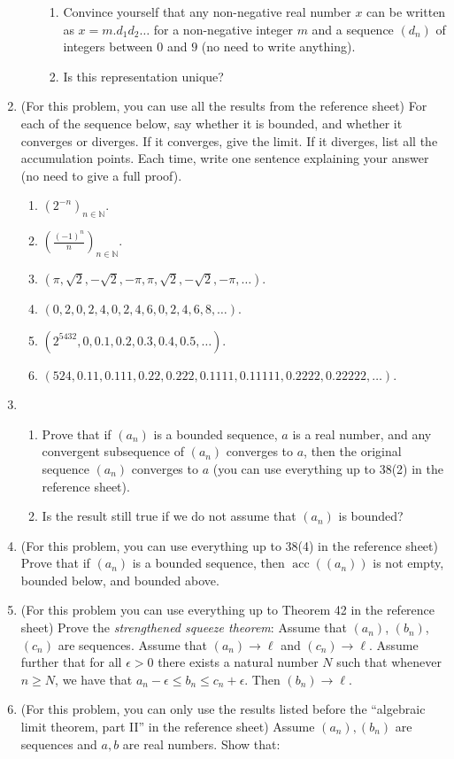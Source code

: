 \documentclass{amsart}
\theoremstyle{definition}
\newcommand{\acc}{\operatorname{acc}}
\begin{document}
\begin{enumerate}
\begin{enumerate}
    \begin{enumerate}
    \item Convince yourself that any non-negative real number $x$ can be written as $x = m. d_1 d_2 \ldots$ for a non-negative integer $m$ and a sequence $(d_n)$ of integers between $0$ and $9$ (no need to write anything).
    \item Is this representation unique?
    \end{enumerate}
  \end{enumerate}
\item (For this problem, you can use all the results from the reference sheet) For each of the sequence below, say whether it is bounded, and whether it converges or diverges. If it converges, give the limit. If it diverges, list all the accumulation points. Each time, write one sentence explaining your answer (no need to give a full proof). 

  \begin{enumerate}

  \item $(2^{-n})_{n \in \mathbb{N}}$.
  \item $(\frac{(-1)^n}{n})_{n \in \mathbb{N}}$.
  \item $(\pi, \sqrt{2}, -\sqrt{2}, -\pi, \pi, \sqrt{2}, -\sqrt{2}, -\pi, \ldots)$.    
  \item $(0, 2, 0, 2, 4, 0, 2, 4, 6, 0, 2, 4, 6, 8, \ldots)$.    
  \item $(2^{5432}, 0, 0.1, 0.2, 0.3, 0.4, 0.5, \ldots)$.
  \item $(524, 0.11, 0.111, 0.22, 0.222, 0.1111, 0.11111, 0.2222, 0.22222, \ldots)$.
  \end{enumerate}
\item
  \begin{enumerate}
  \item Prove that if $(a_n)$ is a bounded sequence, $a$ is a real number, and any convergent subsequence of $(a_n)$ converges to $a$, then the original sequence $(a_n)$ converges to $a$ (you can use everything up to 38(2) in the reference sheet).
  \item Is the result still true if we do not assume that $(a_n)$ is bounded?
  \end{enumerate}
\item (For this problem, you can use everything up to 38(4) in the reference sheet) Prove that if $(a_n)$ is a bounded sequence, then $\acc ((a_n))$ is not empty, bounded below, and bounded above.

\item (For this problem you can use everything up to Theorem 42 in the reference sheet) Prove the \emph{strengthened squeeze theorem}: Assume that $(a_n)$, $(b_n)$, $(c_n)$ are sequences. Assume that $(a_n) \to \ell$ and $(c_n) \to \ell$. Assume further that for all $\epsilon > 0$ there exists a natural number $N$ such that whenever $n \ge N$, we have that $a_n - \epsilon \le b_n \le c_n + \epsilon$. Then $(b_n) \to \ell$. 
\item (For this problem, you can only use the results listed before the ``algebraic limit theorem, part II'' in the reference sheet) Assume $(a_n), (b_n)$ are sequences and $a, b$ are real numbers. Show that:


\end{enumerate}
\end{document}
